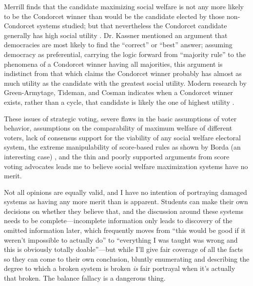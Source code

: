 Merrill finds that the candidate maximizing social welfare is not any more likely to be the Condorcet winner than would be the candidate elected by those non-Condorcet systems studied; but that nevertheless the Condorcet candidate generally has high social utility \autocite{Merrill2014}.  Dr. Kassner mentioned an argument that democracies are most likely to find the ``correct'' or ``best'' answer; assuming democracy as preferential, carrying the logic forward from ``majority rule'' to the phenomena of a Condorcet winner having all majorities, this argument is indistinct from that which claims the Condorcet winner probably has almost as much utility as the candidate with the greatest social utility.  Modern research by Green-Armytage, Tideman, and Cosman indicates when a Condorcet winner exists, rather than a cycle, that candidate is likely the one of highest utility \autocite{GreenArmytage2015}.

These issues of strategic voting, severe flaws in the basic assumptions of voter behavior, assumptions on the comparability of maximum welfare of different voters, lack of consensus support for the viability of any social welfare electoral system, the extreme manipulability of score-based rules as shown by Borda (an interesting case) \autocite{Reilly2002}, and the thin and poorly supported arguments from score voting advocates leads me to believe social welfare maximization systems have no merit.

Not all opinions are equally valid, and I have no intention of portraying damaged systems as having any more merit than is apparent.  Students can make their own decisions on whether they believe that, and the discussion around these systems needs to be complete—incomplete information only leads to discovery of the omitted information later, which frequently moves from ``this would be good if it weren't impossible to actually do'' to ``everything I was taught was wrong and this is obviously totally doable''—but while I'll give fair coverage of all the facts so they can come to their own conclusion, bluntly enumerating and describing the degree to which a broken system is broken \textit{is} fair portrayal when it's actually that broken.  The balance fallacy is a dangerous thing.
